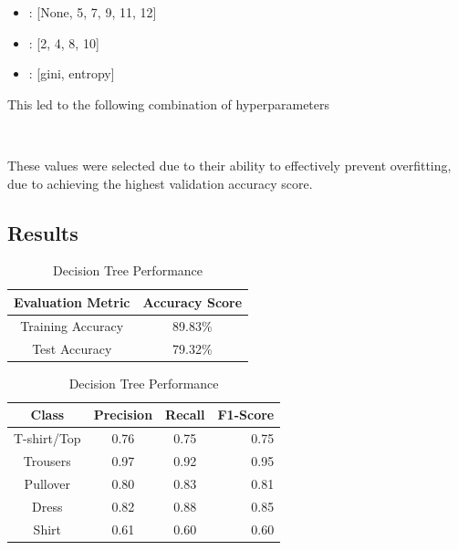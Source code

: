 \begin{center}
    \begin{minipage}{3in}

\begin{itemize}
    \item {}: [None, 5, 7, 9, 11, 12]
    \item {}: [2, 4, 8, 10]
    \item {}: [gini, entropy] \\
\end{itemize}
            \end{minipage}
\end{center}


This led to the following combination of hyperparameters\
\begin{tcolorbox}[colback=white,
                  arc=0pt,
                outer=0pt]
\centering {} \, \,  \, \, \\
   \end{tcolorbox}

These values were selected due to their ability to effectively prevent overfitting, due to achieving the highest validation accuracy score.

\subsection{Results}\label{subsec:results}
\begin{table}[!ht]
\begin{subtable}[c]{0.4\textwidth}
\footnotesize
\centering
\begin{tabular}{ c | c }
 \toprule
 Evaluation Metric & Accuracy Score  \\
 \midrule
 Training Accuracy &  89.83\% \\
 Test Accuracy &79.32\% \\
 \bottomrule
\end{tabular}
\captionsetup{justification=centering,margin=1cm}
\end{subtable}
\begin{subtable}[c]{0.6\textwidth}
\footnotesize
\centering
\begin{tabular}{c | c c r}
Class & Precision & Recall & F1-Score\\
\midrule
T-shirt/Top   &    0.76  &    0.75  &    0.75 \\
Trousers   &    0.97  &    0.92  &    0.95 \\
Pullover   &    0.80  &    0.83  &    0.81\\
Dress   &    0.82  &    0.88  &    0.85\\
Shirt   &    0.61  &    0.60  &    0.60\\
\end{tabular}
\captionsetup{justification=centering,margin=1cm}
\end{subtable}
\caption{Decision Tree Performance}
\label{tab:dt_evaluation}
\end{table}\\

